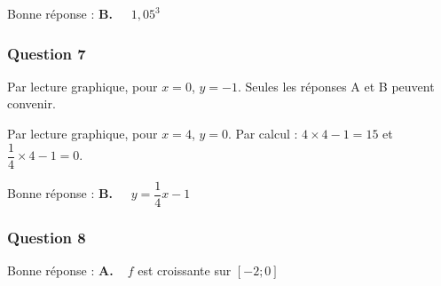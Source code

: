 Bonne réponse : \textbf{B.~~} $1,05^{3}$


\subsubsection*{Question 7}
Par lecture graphique, pour $x = 0$, $y = -1$. Seules les réponses A et B peuvent convenir.

Par lecture graphique, pour $x = 4$, $y = 0$. Par calcul : $4\times 4 - 1 = 15$  et $\dfrac{1}{4}\times 4 - 1 = 0$.

Bonne réponse : \textbf{B.~~} $y=\dfrac{1}{4} x - 1$


\subsubsection*{Question 8}
Bonne réponse : \textbf{A.~~}$f$ est croissante sur $[-2 ; 0]$
